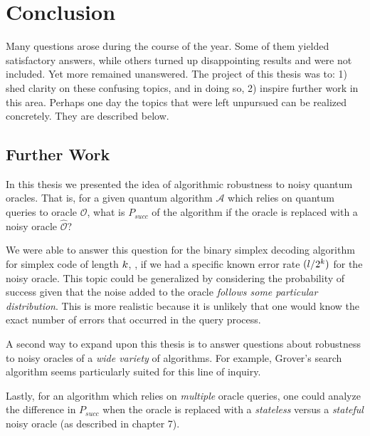 \documentclass[12pt,twoside]{reedthesis}
\theoremstyle{definition}
\begin{document}
\chapter*{Conclusion}
	\setcounter{chapter}{8}
	\setcounter{section}{0}
	
Many questions arose during the course of the year. Some of them yielded satisfactory answers, while others turned up disappointing results and were not included. Yet more remained unanswered. The project of this thesis was to: 1) shed clarity on these confusing topics, and in doing so, 2) inspire further work in this area. Perhaps one day the topics that were left unpursued can be realized concretely. They are described below.

\section{Further Work}
In this thesis we presented the idea of algorithmic robustness to noisy quantum oracles. That is, for a given quantum algorithm $\mathcal{A}$ which relies on quantum queries to oracle $\mathcal{O}$, what is $P_{succ}$ of the algorithm if the oracle is replaced with a noisy oracle $\widehat{\mathcal{O}}$?

We were able to answer this question for the binary simplex decoding algorithm for simplex code of length $k$, \simpl{\mlen}, if we had a specific known error rate $(l/2^k )$ for the noisy oracle. This topic could be generalized by considering the probability of success given that the noise added to the oracle \emph{follows some particular distribution}. This is more realistic because it is unlikely that one would know the exact number of errors that occurred in the query process. 

A second way to expand upon this thesis is to answer questions about robustness to noisy oracles of a \emph{wide variety} of algorithms. For example, Grover's search algorithm \citep{grover1996fast} seems particularly suited for this line of inquiry. 

Lastly, for an algorithm which relies on \emph{multiple} oracle queries, one could analyze the difference in $P_{succ}$ when the oracle is replaced with a \emph{stateless} versus a \emph{stateful} noisy oracle (as described in chapter 7).



    \appendix
\end{document}
